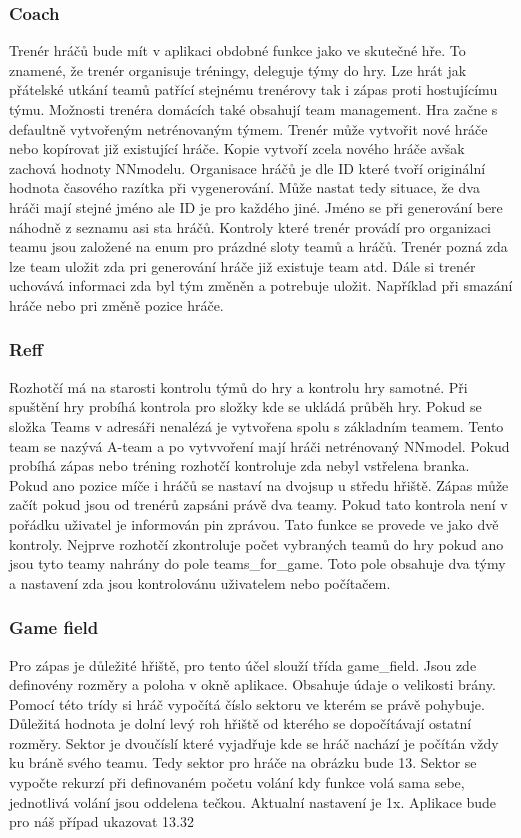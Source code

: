 \documentclass[
  program=ainfk,
  biblatex,
  language=czech,
  figures=true,
  tables ,
  sourcecodes=true,
  glossaries=true,
  index
]{kidiplom}
\begin{document}
\subsubsection{Coach} 
 Trenér hráčů bude mít v aplikaci obdobné funkce jako ve skutečné hře. To znamené, že trenér organisuje tréningy, deleguje týmy do hry. Lze hrát jak přátelské utkání teamů patřící stejnému trenérovy tak i zápas proti hostujícímu týmu. 
Možnosti trenéra domácích také obsahují team management. Hra začne s defaultně vytvořeným netrénovaným týmem. Trenér může vytvořit nové hráče nebo kopírovat již existující hráče. Kopie vytvoří zcela nového hráče avšak zachová hodnoty NNmodelu. Organisace hráčů je dle ID které tvoří originální hodnota časového razítka při vygenerování. Může nastat tedy situace, že dva hráči mají stejné jméno ale ID je pro každého jiné. Jméno se při generování bere náhodně z seznamu asi sta hráčů.
Kontroly které trenér provádí pro organizaci teamu jsou založené na enum pro prázdné sloty teamů a hráčů. Trenér pozná zda lze team uložit zda pri generování hráče již existuje team atd. Dále si trenér uchovává informaci zda byl tým změněn a potrebuje uložit. Například při smazání hráče nebo pri změně pozice hráče. 
 

\subsubsection{Reff} 
Rozhotčí má na starosti kontrolu týmů do hry a kontrolu hry samotné. Při spuštění hry probíhá kontrola pro složky kde se ukládá průběh hry. Pokud se složka Teams v adresáři nenalézá je vytvořena spolu s základním teamem. Tento team se nazývá A-team a po vytvvoření mají hráči netrénovaný NNmodel. Pokud probíhá zápas nebo tréning rozhotčí kontroluje zda nebyl vstřelena branka. Pokud ano pozice míče i hráčů se nastaví na dvojsup u středu hřiště. Zápas může začít pokud jsou od trenérů zapsáni právě dva teamy. Pokud tato kontrola není v pořádku uživatel je informován pin zprávou. Tato funkce se provede ve jako dvě kontroly. Nejprve rozhotčí zkontroluje počet vybraných teamů do hry pokud ano jsou tyto teamy nahrány do pole teams{\_}for{\_}game. Toto pole obsahuje dva týmy a nastavení zda jsou kontrolovánu uživatelem nebo počítačem. 

 
\subsubsection{Game field} 
 Pro zápas je důležité hřiště, pro tento účel slouží třída game{\_}field. Jsou zde definovény rozměry a poloha v okně aplikace. Obsahuje údaje o velikosti brány. Pomocí této trídy si  hráč vypočítá číslo sektoru ve kterém se právě pohybuje. Důležitá hodnota je dolní levý roh hřiště od kterého se dopočítávají ostatní rozměry. Sektor je dvoučíslí které vyjadřuje kde se hráč nachází je počítán vždy ku bráně svého teamu. Tedy sektor pro hráče na obrázku bude 13. Sektor se vypočte rekurzí při definovaném početu volání kdy funkce volá sama sebe, jednotlivá volání jsou oddelena tečkou. Aktualní nastavení je 1x. Aplikace bude pro náš případ ukazovat 13.32  
\end{document}
